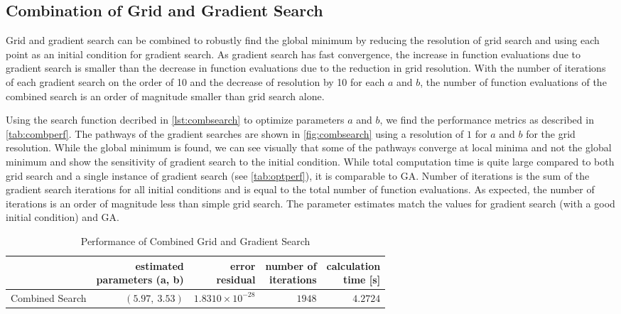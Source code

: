 \documentclass[11pt,a4paper]{article}
\begin{document}
\subsection{Combination of Grid and Gradient Search}
Grid and gradient search can be combined to robustly find the global minimum by
reducing the resolution of grid search and using each point as an initial
condition for gradient search. As gradient search has fast convergence, the
increase in function evaluations due to gradient search is smaller than the
decrease in function evaluations due to the reduction in grid resolution. With
the number of iterations of each gradient search on the order of 10 and the
decrease of resolution by 10 for each $a$ and $b$, the number of function
evaluations of the combined search is an order of magnitude smaller than grid
search alone.

Using the search function decribed in \autoref{lst:combsearch} to optimize
parameters $a$ and $b$, we find the performance metrics as described in
\autoref{tab:combperf}. The pathways of the gradient searches are shown in
\autoref{fig:combsearch} using a resolution of $1$ for $a$ and $b$ for the grid
resolution. While the global minimum is found, we can see visually that some of
the pathways converge at local minima and not the global minimum and show the
sensitivity of gradient search to the initial condition. While total
computation time is quite large compared to both grid search and a single
instance of gradient search (see \autoref{tab:optperf}), it is comparable to
GA. Number of iterations is the sum of the gradient search iterations for all
initial conditions and is equal to the total number of function evaluations. As
expected, the number of iterations is an order of magnitude less than simple
grid search. The parameter estimates match the values for gradient search (with
a good initial condition) and GA.

\begin{table}
    \centering
    \begin{tabular}{|l|r|r|r|r|}
        \hline
        \nonumber & \shortstack[c]{estimated\\parameters (a, b)} &
            \shortstack[c]{error\\residual} &
            \shortstack[c]{number of\\iterations} &
            \shortstack[c]{calculation\\time [s]} \\
        \hline
        Combined Search & $ (5.97,\: 3.53) $ & $ 1.8310 \times 10^{-28} $ &
            $ 1948 $ & $ 4.2724 $ \\
        \hline
    \end{tabular}
    \caption{Performance of Combined Grid and Gradient Search}
    \label{tab:combperf}
\end{table}
\end{document}
